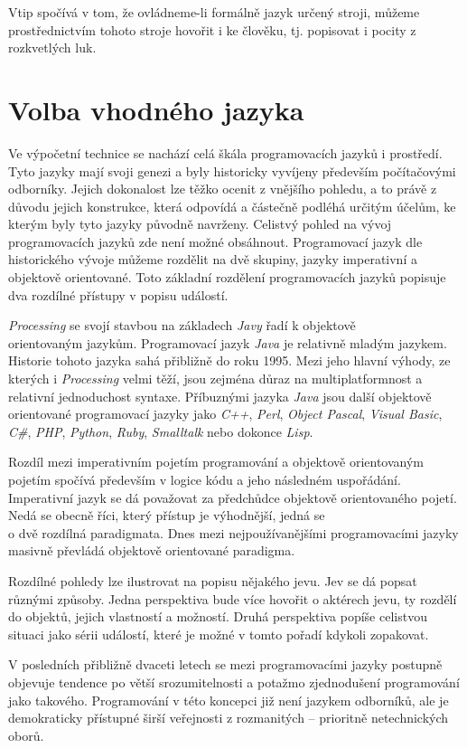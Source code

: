 \documentclass[10pt,twoside=true,open=right,cleardoublepage=empty,chapterprefix=true]{scrbook}
\newcommand{\oddil}[1]{\section{#1}\index{#1}\label{#1}}
\begin{document}
Vtip spočívá v tom, že ovládneme-li formálně jazyk určený stroji, můžeme prostřednictvím tohoto stroje hovořit i ke člověku, tj. popisovat i pocity z rozkvetlých luk.

\oddil{Volba vhodného jazyka}

Ve výpočetní technice se nachází celá škála programovacích jazyků i prostředí. Tyto jazyky mají svoji genezi a byly historicky vyvíjeny především počítačovými odborníky. Jejich dokonalost lze těžko ocenit z vnějšího pohledu, a to právě z důvodu jejich konstrukce, která odpovídá a částečně podléhá určitým účelům, ke kterým byly tyto jazyky původně navrženy. Celistvý pohled na vývoj programovacích jazyků zde není možné obsáhnout. Programovací jazyk dle historického vývoje můžeme rozdělit na dvě skupiny, jazyky imperativní a objektově orientované. Toto základní rozdělení programovacích jazyků popisuje dva rozdílné přístupy v popisu událostí. 

{\em Processing} se svojí stavbou na základech {\em Javy} řadí k objektově \\orientovaným jazykům. Programovací jazyk {\em Java} je relativně mladým jazykem. Historie tohoto jazyka sahá přibližně do roku 1995. Mezi jeho hlavní výhody, ze kterých i {\em Processing} velmi těží, jsou zejména důraz na multiplatformnost a relativní jednoduchost syntaxe. Příbuznými jazyka {\em Java} jsou další objektově orientované programovací jazyky jako {\em  C++}, {\em  Perl}, {\em Object Pascal}, {\em Visual Basic}, {\em C\#}, {\em PHP}, {\em Python}, {\em Ruby}, {\em Smalltalk} nebo dokonce {\em Lisp}. 

Rozdíl mezi imperativním pojetím programování a objektově orientovaným pojetím spočívá především v logice kódu a jeho následném uspořádání. Imperativní jazyk se dá považovat za předchůdce objektově orientovaného pojetí. Nedá se obecně říci, který přístup je výhodnější, jedná se \\o dvě rozdílná paradigmata. Dnes mezi nejpoužívanějšími programovacími jazyky masivně převládá objektově orientované paradigma.

Rozdílné pohledy lze ilustrovat na popisu nějakého jevu. Jev se dá popsat různými způsoby. Jedna perspektiva bude více hovořit o aktérech jevu, ty rozdělí do objektů, jejich vlastností a možností. Druhá perspektiva popíše celistvou situaci jako sérii událostí, které je možné v tomto pořadí kdykoli zopakovat.


V posledních přibližně dvaceti letech se mezi programovacími jazyky postupně objevuje tendence po větší srozumitelnosti a potažmo zjednodušení programování jako takového. Programování v této koncepci již není jazykem odborníků, ale je demokraticky přístupné širší veřejnosti z rozmanitých -- prioritně netechnických oborů. 
\end{document}

